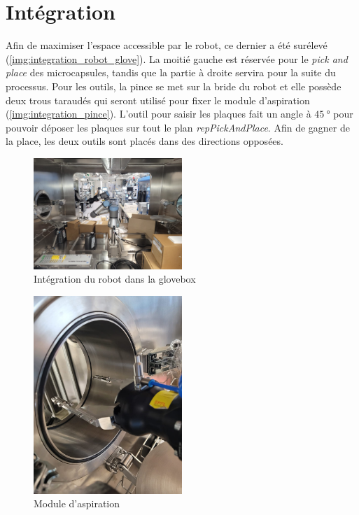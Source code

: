 \section{Intégration}
Afin de maximiser l'espace accessible par le robot, ce dernier a été surélevé (\cf \autoref{img:integration_robot_glove}). La moitié gauche est réservée pour le \textit{pick and place} des \glspl{microcapsule}, tandis que la partie à droite servira pour la suite du processus.
Pour les outils, la pince se met sur la bride du robot et elle possède deux trous taraudés qui seront utilisé pour fixer le module d'aspiration (\cf \autoref{img:integration_pince}).
L'outil pour saisir les plaques fait un angle à $\qty{45}{\degree}$ pour pouvoir déposer les plaques sur tout le plan \textit{repPickAndPlace}. Afin de gagner de la place, les deux outils sont placés dans des directions opposées.
\begin{figure}[ht]
    \centering
    \includegraphics[width = 0.5\textwidth]{assets/figures/Hardware/gloveBox.jpeg}
    \caption{Intégration du robot dans la \gls{glovebox}}
    \label{img:integration_robot_glove}
\end{figure}
\begin{figure}[ht]
    \centering
    \includegraphics[width = 0.5\textwidth]{assets/figures/Hardware/outil_complet.jpeg}
    \caption{Module d'aspiration}
    \label{img:integration_pince}
\end{figure}